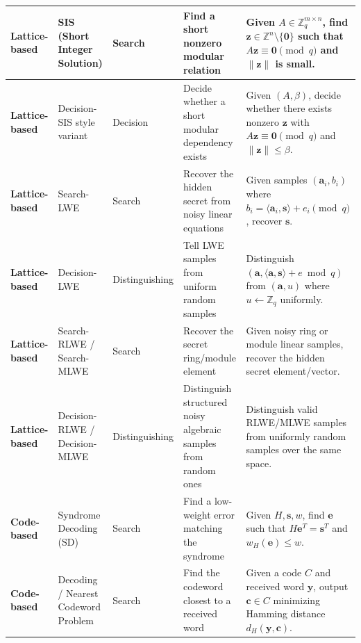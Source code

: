 \documentclass[11pt]{article}
\begin{document}
\begin{center}
\begin{tabular}{|p{1.9cm}|p{2.9cm}|p{3.3cm}|p{4.4cm}|p{4.8cm}|}
			\textbf{Lattice-based} 
			& SIS (Short Integer Solution) 
			& Search 
			& Find a short nonzero modular relation 
			& Given $A \in \mathbb{Z}_q^{m\times n}$, find $\bm z \in \mathbb{Z}^n\setminus\{\bm 0\}$ such that $A\bm z \equiv \bm 0 \pmod q$ and $\|\bm z\|$ is small. \\
			\hline
			
			\textbf{Lattice-based} 
			& Decision-SIS style variant 
			& Decision 
			& Decide whether a short modular dependency exists 
			& Given $(A,\beta)$, decide whether there exists nonzero $\bm z$ with $A\bm z \equiv \bm 0 \pmod q$ and $\|\bm z\|\le \beta$. \\
			\hline
			
			\textbf{Lattice-based} 
			& Search-LWE 
			& Search 
			& Recover the hidden secret from noisy linear equations 
			& Given samples $(\bm a_i,b_i)$ where $b_i=\langle \bm a_i,\bm s\rangle+e_i \pmod q$, recover $\bm s$. \\
			\hline
			
			\textbf{Lattice-based} 
			& Decision-LWE 
			& Distinguishing 
			& Tell LWE samples from uniform random samples 
			& Distinguish $(\bm a,\langle \bm a,\bm s\rangle+e \bmod q)$ from $(\bm a,u)$ where $u \leftarrow \mathbb{Z}_q$ uniformly. \\
			\hline
			
			\textbf{Lattice-based} 
			& Search-RLWE / Search-MLWE 
			& Search 
			& Recover the secret ring/module element 
			& Given noisy ring or module linear samples, recover the hidden secret element/vector. \\
			\hline
			
			\textbf{Lattice-based} 
			& Decision-RLWE / Decision-MLWE 
			& Distinguishing 
			& Distinguish structured noisy algebraic samples from random ones 
			& Distinguish valid RLWE/MLWE samples from uniformly random samples over the same space. \\
			\hline
			
			\textbf{Code-based} 
			& Syndrome Decoding (SD) 
			& Search 
			& Find a low-weight error matching the syndrome 
			& Given $H,\bm s,w$, find $\bm e$ such that $H\bm e^T=\bm s^T$ and $w_H(\bm e)\le w$. \\
			\hline
			
			\textbf{Code-based} 
			& Decoding / Nearest Codeword Problem 
			& Search 
			& Find the codeword closest to a received word 
			& Given a code $C$ and received word $\bm y$, output $\bm c \in C$ minimizing Hamming distance $d_H(\bm y,\bm c)$. \\
			\hline
			

\end{tabular}
\end{center}
\end{document}
